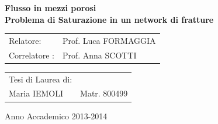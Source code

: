 \begin{titlepage}
\begin{center}
\vspace{20mm}



{\Large {\bf  Flusso in mezzi porosi}} \\[2mm]
{\Large {\bf Problema di Saturazione in un network di fratture}} \\[32mm]


\begin{flushleft}
\begin{normalsize}
	\begin{tabular}{ll}
	Relatore:    &  Prof. Luca FORMAGGIA \\[3mm]
	Correlatore : & Prof. Anna SCOTTI \\[3mm]
	\end{tabular}
\end{normalsize}
\end{flushleft}

\vspace{5mm}
\begin{flushright}
\begin{normalsize}
	\begin{tabular}{ll}
	Tesi di Laurea di:  &                 \\[3mm]
	Maria IEMOLI   &  Matr. 800499\\[3mm]
	\end{tabular}
\end{normalsize}
\end{flushright}


\large{Anno Accademico 2013-2014}


\end{center}
\end{titlepage}


\newpage %
\thispagestyle{empty} %







